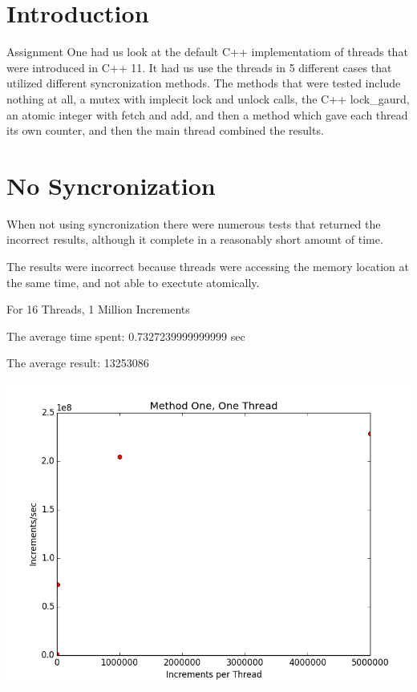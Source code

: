 \documentclass[12pt]{article}
\begin{document}
\maketitle

\section*{Introduction}
Assignment One had us look at the default C++
implementatiom of threads that were introduced in C++
11. It had us use the threads in 5 different cases that
utilized different syncronization methods. The methods
that were tested include nothing at all, a mutex with
implecit lock and unlock calls, the C++ lock\_gaurd, an
atomic integer with fetch and add, and then a method
which gave each thread its own counter, and then the
main thread combined the results.

\section*{No Syncronization}
When not using syncronization there were numerous tests
that returned the incorrect results, although it
complete in a reasonably short amount of time.

The results were incorrect because threads were accessing the memory location at the same time, and not able to exectute atomically.

For 16 Threads, 1 Million Increments

The average time spent: 0.7327239999999999 sec

The average result: 13253086

\includegraphics[scale=.5]{Graphs/MethodOne_1Thread.png}
\end{document}
